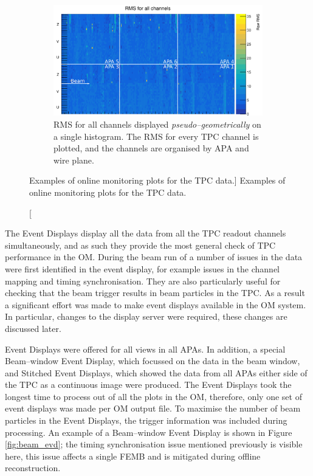 \begin{figure}
	\begin{subfigure}[b]{0.75\textwidth}
		\centering
		\vspace{3mm}
		\includegraphics[width=\textwidth]{figures/all_chan_rms.png}
		\caption {RMS for all channels displayed \emph{pseudo--geometrically} on a 
		single histogram. The RMS for every TPC channel is plotted, and the channels 
		are organised by APA and wire plane.} 
		\label{fig:ped_noise}
	\end{subfigure}

	\caption
	[Examples of online monitoring plots for the TPC data.]
	{Examples of online monitoring plots for the TPC data.}
	\label{fig:tpc_om}

\end{figure}

The Event Displays display all the data from all the TPC readout channels
simultaneously, and as such they provide the most general check of TPC 
performance in the OM. During the beam run of \protodune{} a number of issues in
the data were first identified in the event display, for example issues in the 
channel mapping and timing synchronisation. They are also particularly useful 
for checking that the beam trigger results in beam particles in the TPC. As 
a result a significant effort was made to make event displays available in 
the \protodune{} OM system. In particular, changes to the display server 
were required, these changes are discussed later. 

Event Displays were offered for all views in all APAs. In addition, a special 
Beam--window Event Display, which focussed on the data in the beam window, and 
Stitched Event Displays, which showed the data from all APAs either side of the
TPC as a continuous image were produced. The Event Displays took the longest 
time to process out of all the plots in the OM, therefore, only one set of 
event displays was made per OM output file. To maximise the number of beam 
particles in the Event Displays, the trigger information was included during 
processing. An example of a Beam--window Event Display is shown in Figure 
\ref{fig:beam_evd}; the timing synchronisation issue mentioned previously is 
visible here, this issue affects a single FEMB and is mitigated during offline 
reconstruction.  

